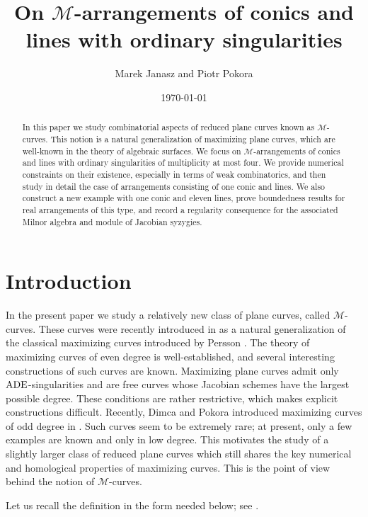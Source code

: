 \documentclass[11pt]{article}
\title{\textbf{On $\mathscr{M}$-arrangements of conics and lines with ordinary singularities}}
\author{
  Marek Janasz and Piotr Pokora
}
\date{\today}
\theoremstyle{plain}
\theoremstyle{definition}
\theoremstyle{remark}
\begin{document}
\maketitle

\begin{abstract}
In this paper we study combinatorial aspects of reduced plane curves known as $\mathscr{M}$-curves. This notion is a natural generalization of maximizing plane curves, which are well-known in the theory of algebraic surfaces. We focus on $\mathscr{M}$-arrangements of conics and lines with ordinary singularities of multiplicity at most four. We provide numerical constraints on their existence, especially in terms of weak combinatorics, and then study in detail the case of arrangements consisting of one conic and lines. We also construct a new example with one conic and eleven lines, prove boundedness results for real arrangements of this type, and record a regularity consequence for the associated Milnor algebra and module of Jacobian syzygies.
\end{abstract}

\section{Introduction}\label{s:introduction}

In the present paper we study a relatively new class of plane curves, called
\(\mathscr{M}\)-curves. These curves were recently introduced in \cite{JanLes} as a
natural generalization of the classical maximizing curves introduced by Persson
\cite{Persson}. The theory of maximizing curves of even degree is well-established,
and several interesting constructions of such curves are known. Maximizing plane
curves admit only \({\rm ADE}\)-singularities and are free curves whose Jacobian
schemes have the largest possible degree. These conditions are rather restrictive,
which makes explicit constructions difficult. Recently, Dimca and Pokora introduced
maximizing curves of odd degree in \cite{DimPok}. Such curves seem to be extremely
rare; at present, only a few examples are known and only in low degree. This motivates the
study of a slightly larger class of reduced plane curves which still shares the key
numerical and homological properties of maximizing curves. This is the point of view
behind the notion of \(\mathscr{M}\)-curves.

Let us recall the definition in the form needed below; see
\cite[Definitions 4.1 and 4.7]{JanLes}.
\end{document}
